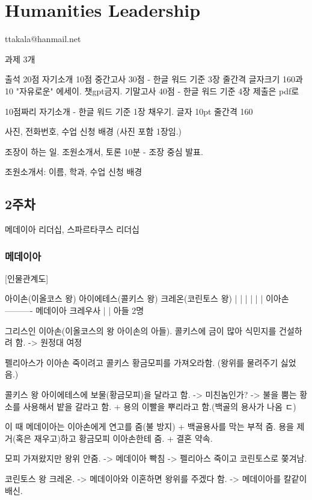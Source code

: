 \chapter{Humanities Leadership}

ttakala@hanmail.net

과제 3개

출석 20점 자기소개 10점 중간고사 30점 - 한글 워드 기준 3장 줄간격 글자크기 160과
10 "자유로운" 에세이. 챗gpt금지. 기말고사 40점 - 한글 워드 기준 4장 제출은 pdf로

10점짜리 자기소개 - 한글 워드 기준 1장 채우기. 글자 10pt 줄간격 160

사진, 전화번호, 수업 신청 배경 (사진 포함 1장임.)

조장이 하는 일. 조원소개서, 토론 10분 - 조장 중심 발표.

조원소개서: 이름, 학과, 수업 신청 배경

\section{2주차}
메데이아 리더십, 스파르타쿠스 리더십

\subsection{메데이아}

[인물관계도]


아이손(이올코스 왕)     아이에테스(콜키스 왕)      크레온(코린토스 왕)
  |                 |                       |
  |                 |                       |
이아손  ----------  메데이아                  크레우사
            |
            |
          아들 2명

그리스인 이아손(이올코스의 왕 아이손의 아들). 콜키스에 금이 많아 식민지를
건설하려 함. -> 원정대 여정

펠리아스가 이아손 죽이려고 콜키스 황금모피를 가져오라함. (왕위를 물려주기
싫었음.)

콜키스 왕 아이에테스에 보물(황금모피)을 달라고 함. -> 미친놈인가? -> 불을 뿜는
황소를 사용해서 밭을 갈라고 함. + 용의 이빨을 뿌리라고 함.(백골의 용사가 나옴
ㄷ)

이 때 메데이아는 이아손에게 연고를 줌(불 방지) + 백골용사를 막는 부적 줌. 용을
제거(혹은 재우고)하고 황금모피 이아손한테 줌. + 결혼 약속.

모피 가져왔지만 왕위 안줌. -> 메데이아 빡침 -> 펠리아스 죽이고 코린토스로
쫒겨남.

코린토스 왕 크레온. -> 메데이아와 이혼하면 왕위를 주겠다 함. -> 메데이아를
칼같이 배신.

